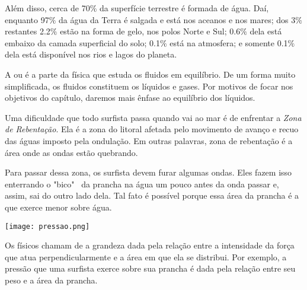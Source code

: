 \documentclass[book, 12pt, twoside, a5paper, english, brazil, sumario=tradicional, openany]{abntex2}
\begin{document}
Além disso, cerca de 70$\%$ da superfície terrestre é formada de água. Daí, enquanto 97$\%$ da água da Terra é salgada e está nos aceanos e nos mares; dos 3$\%$ restantes 2.2$\%$ estão na forma de gelo, nos polos Norte e Sul; 0.6$\%$ dela está embaixo da camada superficial do solo; 0.1$\%$ está na atmosfera; e somente 0.1$\%$ dela está disponível nos rios e lagos do planeta.

\vspace{-0.8cm}

{}

\vspace{-0.3cm}

A {\color{celestialblue}{estática dos fluidos}} ou {\color{celestialblue}{Hidrostática}} é a parte da física que estuda os fluidos em equilíbrio. De um forma muito simplificada, os fluidos constituem os líquidos e gases. Por motivos de focar nos objetivos do capítulo, daremos mais ênfase ao equilíbrio dos líquidos.

{}

\vspace{-0.3cm}

Uma dificuldade que todo surfista passa quando vai ao mar é de enfrentar a \textit{Zona de Rebentação}. Ela é a zona do litoral afetada pelo movimento de avanço e recuo das águas imposto pela ondulação. Em outras palavras, zona de rebentação é a área onde as ondas estão quebrando.

Para passar dessa zona, os surfista devem furar algumas ondas. Eles fazem isso enterrando o "bico" \ da prancha na água um pouco antes da onda passar e, assim, sai do outro lado dela. Tal fato é possível porque essa área da prancha é a que exerce menor {\color{celestialblue}{pressão}} sobre água.

\vspace{0.5cm}
\begin{center}
    \texttt{[image: pressao.png]} 
\end{center}
\vspace{-0.13cm}

Os físicos chamam de {\color{celestialblue}{pressão}} a grandeza dada pela relação entre a intensidade da força que atua perpendicularmente e a área em que ela se distribui\nocite{3}. Por exemplo, a pressão que uma surfista exerce sobre sua prancha é dada pela relação entre seu peso e a área da prancha.
\end{document}
